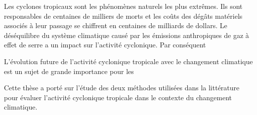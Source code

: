 \documentclass[../main.tex]{subfiles}
\begin{document}
Les cyclones tropicaux sont les phénomènes naturels les plus extrêmes. Ils sont responsables de centaines de milliers de morts et les coûts des dégâts matériels associés
à leur passage se chiffrent en centaines de milliards de dollars. Le déséquilibre du système climatique causé par les émissions anthropiques de gaz à effet de
serre a un impact sur l'activité cyclonique. Par conséquent 

L'évolution future de l'activité cyclonique tropicale avec le changement climatique est un sujet de grande importance pour les 

Cette thèse a porté sur l'étude des deux méthodes utilisées dans la littérature pour évaluer l'activité cyclonique tropicale dans le contexte du changement
climatique.
\end{document}

